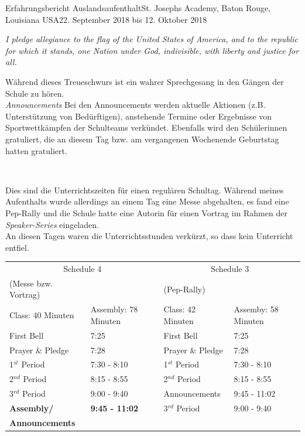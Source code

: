 \documentclass[oneside,openany,headings=optiontotoc,11pt,numbers=noenddot]{article}
\begin{document}
\begin{worksheet}{Erfahrungsbericht Auslandsaufenthalt}{St. Joseph\grq{}s Academy, Baton Rouge, Louisiana USA}{22. September 2018 bis 12. Oktober 2018}
{\begin{center}
\begin{minipage}{0.7\textwidth}
\begin{center}
					\textit{\glqq{}I pledge allegiance to the flag of the United States of America, and to the republic for which it stands, one Nation under God, indivisible, with liberty and justice for all.\grqq{}}
				\end{center}
				\normalsize
			\end{minipage}
		\end{center}	
		Während dieses Treueschwurs ist ein wahrer Sprechgesang in den Gängen der Schule zu hören.\\
		\indent
		\textit{Announcements} Bei den Announcements werden aktuelle Aktionen (z.B. Unterstützung von Bedürftigen), anstehende Termine oder Ergebnisse von Sportwettkämpfen der Schulteams verkündet. Ebenfalls wird den Schülerinnen gratuliert, die an diesem Tag bzw. am vergangenen Wochenende Geburtstag hatten gratuliert.}\\
		\normalsize
		\par\noindent
		Dies sind die Unterrichtszeiten für einen regulären Schultag. Während meines Aufenthalts wurde allerdings an einem Tag eine Messe abgehalten, es fand eine Pep-Rally und die Schule hatte eine Autorin für einen Vortrag im Rahmen der \textit{Speaker-Series} eingeladen.\\
		An diesen Tagen waren die Unterrichtsstunden verkürzt, so dass kein Unterricht entfiel.\\
		\par\noindent
		\tiny
		\begin{tabularx}{\textwidth}{X|X||X|X}
			\multicolumn{2}{c}{Schedule 4} & \multicolumn{2}{c}{Schedule 3}\\
			(Messe bzw. Vortrag) & & (Pep-Rally)\\
			Class: 40 Minuten & Assembly: 78 Minuten & Class: 42 Minuten & Assemby: 58 Minuten\\
			\hline
			\hline
			First Bell & 7:25 & First Bell & 7:25\\
			Prayer \& Pledge & 7:28 & Prayer \& Pledge & 7:28\\
			1\(^{st}\) Period & 7:30 - 8:10 & 1\(^{st}\) Period & 7:30 - 8:10\\
			2\(^{nd}\) Period & 8:15 - 8:55 & 2\(^{nd}\) Period & 8:15 - 8:55\\
			\cline{3-4}
			3\(^{rd}\) Period & 9:00 - 9:40 & Announcements & 9:45 - 11:02\\
			\hline
			\textbf{Assembly/} & \textbf{9:45 - 11:02} & 3\(^{rd}\) Period & 9:00 - 9:40\\
			\textbf{Announcements} & & \\

\end{tabularx}
\end{worksheet}
\end{document}
